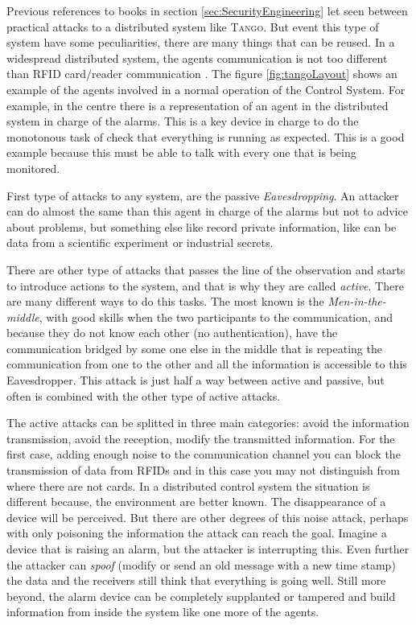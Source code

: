 \documentclass[10pt,a4paper,twoside]{llncs}
\newcommand{\tango}{\textsc{Tango}}
\begin{document}
Previous references to books in section \ref{sec:SecurityEngineering} let seen between practical attacks to a distributed system like \tango. But event this type of system have some peculiarities, there are many things that can be reused. In a widespread distributed system, the agents communication is not too different than RFID card/reader communication \cite{Santi11}. The figure \ref{fig:tangoLayout} shows an example of the agents involved in a normal operation of the Control System. For example, in the centre there is a representation of an agent in the distributed system in charge of the alarms. This is a key device in charge to do the monotonous task of check that everything is running as expected. This is a good example because this must be able to talk with every one that is being monitored.

First type of attacks to any system, are the passive \emph{Eavesdropping}. An attacker can do almost the same than this agent in charge of the alarms but not to advice about problems, but something else like record private information, like can be data from a scientific experiment or industrial secrets.

There are other type of attacks that passes the line of the observation and starts to introduce actions to the system, and that is why they are called \emph{active}. There are many different ways to do this tasks. The most known is the \emph{Men-in-the-middle}, with good skills when the two participants to the communication, and because they do not know each other (no authentication), have the communication bridged by some one else in the middle that is repeating the communication from one to the other and all the information is accessible to this Eavesdropper. This attack is just half a way between active and passive, but often is combined with the other type of active attacks.

The active attacks can be splitted in three main categories: avoid the information transmission, avoid the reception, modify the transmitted information. For the first case, adding enough noise to the communication channel you can block the transmission of data from RFIDs and in this case you may not distinguish from where there are not cards. In a distributed control system the situation is different because, the environment are better known. The disappearance of a device will be perceived. But there are other degrees of this noise attack, perhaps with only poisoning the information the attack can reach the goal. Imagine a device that is raising an alarm, but the attacker is interrupting this. Even further the attacker can \emph{spoof} (modify or send an old message with a new time stamp) the data and the receivers still think that everything is going well. Still more beyond, the alarm device can be completely supplanted or tampered and build information from inside the system like one more of the agents.
\end{document}
